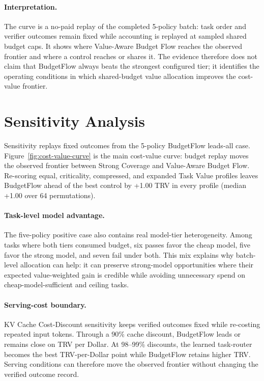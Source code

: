\documentclass[letterpaper]{article}
\newcommand{\method}{BudgetFlow\xspace}
\newcommand{\trv}{TRV\xspace}
\begin{document}
\paragraph{Interpretation.}
The curve is a no-paid replay of the completed 5-policy batch: task order and verifier outcomes remain fixed while accounting is replayed at sampled shared budget caps. It shows where Value-Aware Budget Flow reaches the observed frontier and where a control reaches or shares it. The evidence therefore does not claim that \method always beats the strongest configured tier; it identifies the operating conditions in which shared-budget value allocation improves the cost-value frontier.

\section{Sensitivity Analysis}
\label{sec:sensitivity}
Sensitivity replays fixed outcomes from the 5-policy BudgetFlow leads-all case. Figure~\ref{fig:cost-value-curve} is the main cost-value curve: budget replay moves the observed frontier between Strong Coverage and Value-Aware Budget Flow. Re-scoring equal, criticality, compressed, and expanded Task Value profiles leaves \method ahead of the best control by +1.00 \trv in every profile (median +1.00 over 64 permutations).

\paragraph{Task-level model advantage.}
The five-policy positive case also contains real model-tier heterogeneity. Among tasks where both tiers consumed budget, six passes favor the cheap model, five favor the strong model, and seven fail under both. This mix explains why batch-level allocation can help: it can preserve strong-model opportunities where their expected value-weighted gain is credible while avoiding unnecessary spend on cheap-model-sufficient and ceiling tasks.

\paragraph{Serving-cost boundary.}
KV Cache Cost-Discount sensitivity keeps verified outcomes fixed while re-costing repeated input tokens. Through a 90\% cache discount, BudgetFlow leads or remains close on \trv per Dollar. At 98--99\% discounts, the learned task-router becomes the best \trv-per-Dollar point while BudgetFlow retains higher \trv. Serving conditions can therefore move the observed frontier without changing the verified outcome record.
\end{document}
